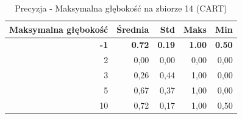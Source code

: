 \begin{table}[htbp]
\centering
\small
\setlength{\tabcolsep}{6pt}
\renewcommand{\arraystretch}{1.2}
\caption{Precyzja - Maksymalna głębokość na zbiorze 14 (CART)}
\label{tab:CART_max_depth_14_precision}
\begin{tabular}{r|r|r|r|r}
\toprule
Maksymalna głębokość & Średnia & Std & Maks & Min \\
\hline
\textbf{-1} & \textbf{0.72} & \textbf{0.19} & \textbf{1.00} & \textbf{0.50} \\
2 & 0,00 & 0,00 & 0,00 & 0,00 \\
3 & 0,26 & 0,44 & 1,00 & 0,00 \\
5 & 0,67 & 0,37 & 1,00 & 0,00 \\
10 & 0,72 & 0,17 & 1,00 & 0,50 \\
\bottomrule
\end{tabular}
\end{table}